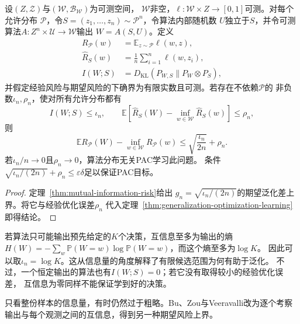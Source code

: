 \begin{theorem}[互信息稳定性与可学习性]
\label{thm:mutual-information-learning}
设$(Z,\mathcal Z)$与$(\mathcal W,\mathcal B_{\mathcal W})$为可测空间，
$\mathcal W$非空，$\ell:\mathcal W\times Z\to[0,1]$可测。对每个允许分布
$\mathcal P$，令$S=(z_1,\ldots,z_n)\sim\mathcal P^n$，令算法内部随机数
$U$独立于$S$，并令可测算法$A:Z^n\times\mathcal U\to\mathcal W$输出
$W=A(S,U)$。定义
\[
\begin{aligned}
 R_{\mathcal P}(w)
 &=\mathbb E_{z\sim\mathcal P}\ell(w,z),\\
 \hat R_S(w)
 &=\frac1n\sum_{i=1}^n\ell(w,z_i),\\
 I(W;S)
 &=D_{\mathrm{KL}}(P_{W,S}\|P_W\otimes P_S),
\end{aligned}
\]
并假定经验风险与期望风险的下确界为有限实数且可测。若存在不依赖$\mathcal P$的
非负数$\iota_n,\rho_n$，使对所有允许分布都有
\[
 I(W;S)\leq\iota_n,\qquad
 \mathbb E[\hat R_S(W)-\inf_{w\in\mathcal W}\hat R_S(w)]\leq\rho_n,
\]
则
\[
 \mathbb E R_{\mathcal P}(W)-\inf_{w\in\mathcal W}R_{\mathcal P}(w)
 \leq\sqrt{\frac{\iota_n}{2n}}+\rho_n.
\]
若$\iota_n/n\to0$且$\rho_n\to0$，算法分布无关PAC学习此问题。
条件$\sqrt{\iota_n/(2n)}+\rho_n\leq\varepsilon\delta$足以保证PAC目标。
\end{theorem}
\begin{proof}
定理~\ref{thm:mutual-information-risk}给出
$g_n=\sqrt{\iota_n/(2n)}$的期望泛化差上界。将它与经验优化误差$\rho_n$
代入定理~\ref{thm:generalization-optimization-learning}即得结论。
\end{proof}

若算法只可能输出预先给定的$K$个决策，互信息至多为输出的熵
$H(W)=-\sum_w\mathbb P(W=w)\log\mathbb P(W=w)$，而这个熵至多为$\log K$。
因此可以取$\iota_n=\log K$。这从信息量的角度解释了有限候选范围为何有助于泛化。
不过，一个恒定输出的算法也有$I(W;S)=0$；若它没有取得较小的经验优化误差，
互信息为零同样不能保证学到好的决策。

只看整份样本的信息量，有时仍然过于粗略。Bu、Zou与Veeravalli改为逐个考察
输出与每个观测之间的互信息，得到另一种期望风险上界。

